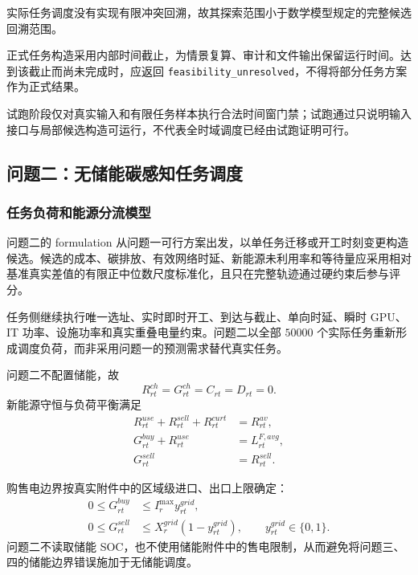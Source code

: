 实际任务调度没有实现有限冲突回溯，故其探索范围小于数学模型规定的完整候选回溯范围。

正式任务构造采用内部时间截止，为情景复算、审计和文件输出保留运行时间。达到该截止而尚未完成时，应返回 \texttt{feasibility\_unresolved}，不得将部分任务方案作为正式结果。

试跑阶段仅对真实输入和有限任务样本执行合法时间窗门禁；试跑通过只说明输入接口与局部候选构造可运行，不代表全时域调度已经由试跑证明可行。

\subsection{问题二：无储能碳感知任务调度}

\subsubsection{任务负荷和能源分流模型}

问题二的 formulation 从问题一可行方案出发，以单任务迁移或开工时刻变更构造候选。候选的成本、碳排放、有效网络时延、新能源未利用率和等待量应采用相对基准真实差值的有限正中位数尺度标准化，且只在完整轨迹通过硬约束后参与评分。

任务侧继续执行唯一选址、实时即时开工、到达与截止、单向时延、瞬时 GPU、IT 功率、设施功率和真实重叠电量约束。问题二以全部 $50000$ 个实际任务重新形成调度负荷，而非采用问题一的预测需求替代真实任务。

问题二不配置储能，故
\begin{equation}
R_{rt}^{ch}=G_{rt}^{ch}=C_{rt}=D_{rt}=0.
\end{equation}
新能源守恒与负荷平衡满足
\begin{align}
R_{rt}^{use}+R_{rt}^{sell}+R_{rt}^{curt}
&=R_{rt}^{av}, \label{eq:q2_renewable}\\
G_{rt}^{buy}+R_{rt}^{use}
&=L_{rt}^{F,avg}, \label{eq:q2_balance}\\
G_{rt}^{sell}&=R_{rt}^{sell}. \label{eq:q2_sell}
\end{align}

购售电边界按真实附件中的区域级进口、出口上限确定：
\begin{align}
0\le G_{rt}^{buy}
&\le I_r^{\max}y_{rt}^{grid},\\
0\le G_{rt}^{sell}
&\le X_r^{grid}(1-y_{rt}^{grid}),
\qquad y_{rt}^{grid}\in\{0,1\}.
\end{align}
问题二不读取储能 SOC，也不使用储能附件中的售电限制，从而避免将问题三、四的储能边界错误施加于无储能调度。

